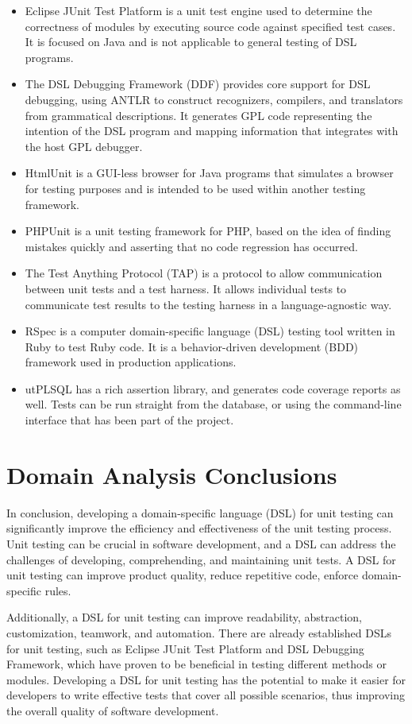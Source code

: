 \begin{itemize}
    \item Eclipse JUnit Test Platform is a unit test engine used to determine the correctness of modules by executing source code against specified test cases. It is focused on Java and is not applicable to general testing of DSL programs.
    \item The DSL Debugging Framework (DDF) provides core support for DSL debugging, using ANTLR to construct recognizers, compilers, and translators from grammatical descriptions. It generates GPL code representing the intention of the DSL program and mapping information that integrates with the host GPL debugger.
    \item HtmlUnit is a GUI-less browser for Java programs that simulates a browser for testing purposes and is intended to be used within another testing framework.
    \item PHPUnit is a unit testing framework for PHP, based on the idea of finding mistakes quickly and asserting that no code regression has occurred.
    \item The Test Anything Protocol (TAP) is a protocol to allow communication between unit tests and a test harness. It allows individual tests to communicate test results to the testing harness in a language-agnostic way. 
    \item RSpec is a computer domain-specific language (DSL) testing tool written in Ruby to test Ruby code. It is a behavior-driven development (BDD) framework used in production applications.
    \item utPLSQL has a rich assertion library, and generates code coverage reports as well. Tests can be run straight from the database, or using the command-line interface that has been part of the project.

\end{itemize}


\section{Domain Analysis Conclusions}
In conclusion, developing a domain-specific language (DSL) for unit testing can significantly improve the efficiency and effectiveness of the unit testing process. Unit testing can be crucial in software development, and a DSL can address the challenges of developing, comprehending, and maintaining unit tests. A DSL for unit testing can improve product quality, reduce repetitive code, enforce domain-specific rules.

Additionally, a DSL for unit testing can improve readability, abstraction, customization, teamwork, and automation. There are already established DSLs for unit testing, such as Eclipse JUnit Test Platform and DSL Debugging Framework, which have proven to be beneficial in testing different methods or modules. Developing a DSL for unit testing has the potential to make it easier for developers to write effective tests that cover all possible scenarios, thus improving the overall quality of software development.